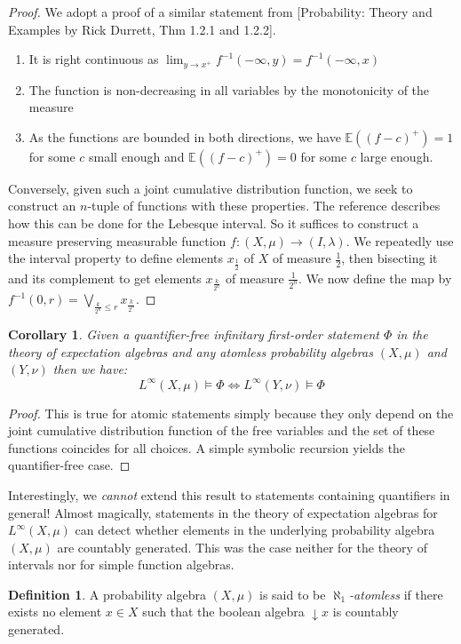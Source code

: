 \documentclass[a4paper]{amsproc}
\theoremstyle{plain}
\newtheorem{corollary}[theorem]{Corollary}
\theoremstyle{definition}
\newtheorem{definition}[theorem]{Definition}
\theoremstyle{remark}
\numberwithin{equation}{section}
\begin{document}
\begin{proof}
We adopt a proof of a similar statement from [Probability: Theory and Examples by Rick Durrett, Thm 1.2.1 and 1.2.2]. 
\begin{enumerate}
\item It is right continuous as $\lim_{y\rightarrow x^+}f^{-1}(-\infty,y)=f^{-1}(-\infty, x)$
\item The function is non-decreasing in all variables by the monotonicity of the measure
\item As the functions are bounded in both directions, we have $\mathbb{E}((f-c)^+)=1$ for some $c$ small enough and $\mathbb{E}((f-c)^+)=0$ for some $c$ large enough. 
\end{enumerate}
Conversely, given such a joint cumulative distribution function, we seek to construct an $n$-tuple of functions with these properties. The reference describes how this can be done for the Lebesque interval. So it suffices to construct a measure preserving measurable function $f:(X,\mu)\rightarrow (I,\lambda)$. We repeatedly use the interval property to define elements $x_{\frac{1}{2}}$ of $X$ of measure $\frac{1}{2}$, then bisecting it and its complement to get elements $x_{\frac{k}{2^n}}$ of measure $\frac{1}{2^n}$. We now define the map by $f^{-1}(0,r)=\bigvee_{\frac{k}{2^n}\leq r} x_{\frac{k}{2^n}} $. %
\end{proof}
\begin{corollary}\label{quantifierfreeLinfty}
Given a \emph{quantifier-free} infinitary first-order statement $\Phi$ in the theory of expectation algebras and any atomless probability algebras $(X,\mu)$ and $(Y,\nu)$ then we have:
\[L^\infty(X,\mu)\vDash\Phi \iff L^\infty(Y,\nu)\vDash \Phi \]
\end{corollary}
\begin{proof}
This is true for atomic statements simply because they only depend on the joint cumulative distribution function of the free variables and the set of these functions coincides for all choices. A simple symbolic recursion yields the quantifier-free case. 
\end{proof}  
Interestingly, we \emph{cannot} extend this result to statements containing quantifiers in general! Almost magically, statements in the theory of expectation algebras for $L^\infty(X,\mu)$ can detect whether elements in the underlying probability algebra $(X,\mu)$ are countably generated. This was the case neither for the theory of intervals nor for simple function algebras. 
\begin{definition} A probability algebra $(X,\mu)$ is said to be $\aleph_1$\emph{-atomless} if there exists no element $x\in X$ such that the boolean algebra $\downarrow x$ is countably generated.
\end{definition}
\end{document}

